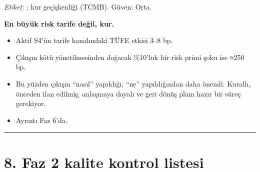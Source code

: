 \endgroup

\emph{Etiket:} \etiketH{}; kur geçişkenliği \etiketV{} (TCMB). Güven: Orta.

\textbf{En büyük risk tarife değil, kur.}

\begin{itemize}
\tightlist
\item
  Aktif S4'ün tarife kanalındaki TÜFE etkisi 3--8 bp.
\item
  Çıkışın kötü yönetilmesinden doğacak \%10'luk bir risk primi şoku ise ≈250 bp.
\item
  Bu yüzden çıkışın ``nasıl'' yapıldığı, ``ne'' yapıldığından daha önemli. Kurallı, önceden ilan edilmiş, anlaşmaya dayalı ve geri dönüş planı hazır bir süreç gerekiyor.
\item
  Ayrıntı Faz 6'da.
\end{itemize}

\begin{center}\rule{0.5\linewidth}{0.5pt}\end{center}

\hypertarget{02b_secenekler_hukuk-8-faz-2-kalite-kontrol-listesi}{%
\section{8. Faz 2 kalite kontrol listesi}\label{02b_secenekler_hukuk-8-faz-2-kalite-kontrol-listesi}}

\begingroup\gbtablo\small

